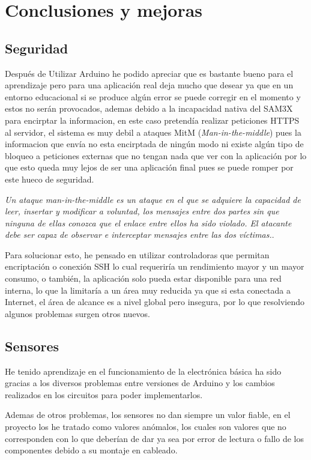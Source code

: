 
\chapter{Conclusiones y mejoras}

\section{Seguridad}

Después de Utilizar Arduino he podido apreciar que es bastante bueno para el aprendizaje pero para una aplicación real deja mucho que desear ya que en un entorno educacional si se produce algún error se puede corregir en el momento y estos no serán provocados, ademas debido a la incapacidad nativa del SAM3X para encirptar la informacion, en este caso pretendía realizar peticiones HTTPS al servidor, el sistema es muy debil a ataques MitM (\textit{Man-in-the-middle}) pues la informacion que envía no esta encirptada de ningún modo ni existe algún tipo de bloqueo a peticiones externas que no tengan nada que ver con la aplicación por lo que esto queda muy lejos de ser una aplicación final pues se puede romper por este hueco de seguridad.

\textit{Un ataque man-in-the-middle es un ataque en el que se adquiere la capacidad de leer, insertar y modificar a voluntad, los mensajes entre dos partes sin que ninguna de ellas conozca que el enlace entre ellos ha sido violado. El atacante debe ser capaz de observar e interceptar mensajes entre las dos víctimas.}\cite{mitm}.

Para solucionar esto, he pensado en utilizar controladoras que permitan encriptación o conexión SSH lo cual requeriría un rendimiento mayor y un mayor consumo, o también, la aplicación solo pueda estar disponible para una red interna, lo que la limitaría a un área muy reducida ya que si esta conectada a Internet, el área de alcance es a nivel global pero insegura, por lo que resolviendo algunos problemas surgen otros nuevos.

\section{Sensores}

He tenido aprendizaje en el funcionamiento de la electrónica básica ha sido gracias a los diversos problemas entre versiones de Arduino y los cambios realizados en los circuitos para poder implementarlos.

Ademas de otros problemas, los sensores no dan siempre un valor fiable, en el proyecto los he tratado como valores anómalos, los cuales son valores que no corresponden con lo que deberían de dar ya sea por error de lectura o fallo de los componentes debido a su montaje en cableado.

